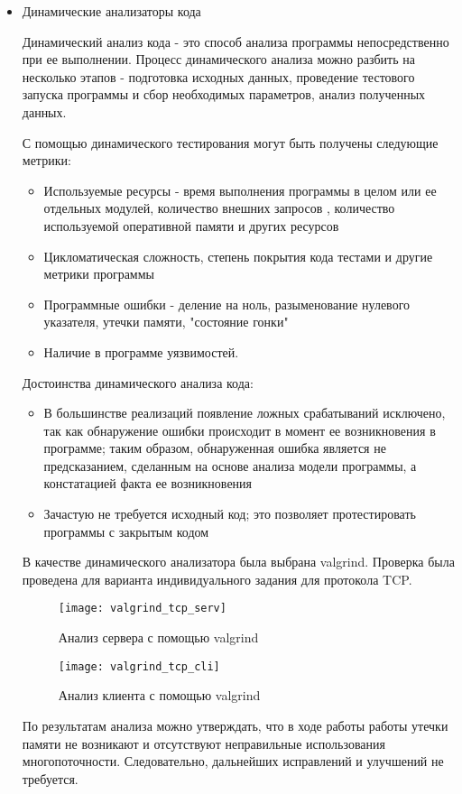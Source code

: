 \begin{itemize}
	\item Динамические анализаторы кода
	
	Динамический анализ кода - это способ анализа программы непосредственно при ее выполнении. Процесс динамического анализа можно разбить на несколько этапов - подготовка исходных данных, проведение тестового запуска программы и сбор необходимых параметров, анализ полученных данных.
	
	С помощью динамического тестирования могут быть получены следующие метрики:
	
	\begin{itemize}
		\item Используемые ресурсы - время выполнения программы в целом или ее отдельных модулей, количество внешних запросов , количество используемой оперативной памяти и других ресурсов
		\item Цикломатическая сложность, степень покрытия кода тестами и другие метрики программы
		\item Программные ошибки - деление на ноль, разыменование нулевого указателя, утечки памяти, "состояние гонки"
		\item Наличие в программе уязвимостей.
	\end{itemize}

	Достоинства динамического анализа кода:
	
	\begin{itemize}
		\item В большинстве реализаций появление ложных срабатываний исключено, так как обнаружение ошибки происходит в момент ее возникновения в программе; таким образом, обнаруженная ошибка является не предсказанием, сделанным на основе анализа модели программы, а констатацией факта ее возникновения
		\item Зачастую не требуется исходный код; это позволяет протестировать программы с закрытым кодом
	\end{itemize}
	
	В качестве динамического анализатора была выбрана valgrind. Проверка была проведена для варианта индивидуального задания для протокола TCP.

\begin{figure}[H]
	\begin{center}
		\texttt{[image: valgrind\_tcp\_serv]}
		\caption{Анализ сервера с помощью valgrind} 
		\label{pic:valgrind_tcp_serv.png} %
	\end{center}
\end{figure}

\begin{figure}[H]
	\begin{center}
		\texttt{[image: valgrind\_tcp\_cli]}
		\caption{Анализ клиента с помощью valgrind} 
		\label{pic:valgrind_tcp_cli} %
	\end{center}
\end{figure}

По результатам анализа можно утверждать, что в ходе работы работы утечки памяти не возникают и отсутствуют неправильные использования многопоточности. Следовательно, дальнейших исправлений и улучшений не требуется.
\end{itemize}

